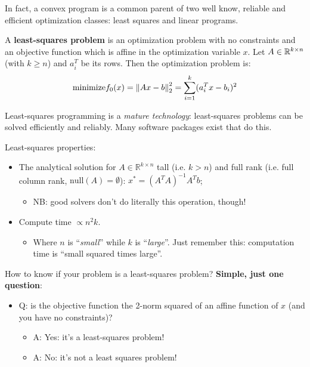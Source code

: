 In fact, a convex program is a common parent of two well know, reliable and efficient optimization classes: least squares and linear programs.


\begin{Definition}
  A \textbf{least-squares problem} is an optimization problem with no constraints and an objective function which is affine in the optimization variable $x$. Let $A\in\mathbb R^{k\times n}$ (with $k\ge n$) and $a_i^T$ be its rows. Then the optimization problem is:
  \begin{equation*}
    \text{minimize} f_0(x) = \left\|Ax-b\right\|_{2}^2 = \sum_{i=1}^k (a_i^Tx-b_i)^2
  \end{equation*}
\end{Definition}

Least-squares programming is a \textit{mature technology}: least-squares problems can be solved efficiently and reliably. Many software packages exist that do this.

\begin{Fact}
  Least-squares properties:
  \begin{itemize}
  \item The analytical solution for $A\in\mathbb R^{k\times n}$ tall (i.e. $k>n$) and full rank (i.e. full column rank, $\text{null}(A)=\emptyset$): $x^*=(A^TA)^{-1}A^Tb$;
    \begin{itemize}
    \item NB: good solvers don't do literally this operation, though!
    \end{itemize}
  \item Compute time $\propto n^2k$.
    \begin{itemize}
    \item Where $n$ is ``\textit{small}'' while $k$ is ``\textit{large}''. Just remember this: computation time is ``small squared times large''.
    \end{itemize}
  \end{itemize}
\end{Fact}

How to know if your problem is a least-squares problem? \textbf{Simple, just one question}:

\begin{itemize}
\item Q: is the objective function the 2-norm squared of an affine function of $x$ (and you have no constraints)?
  \begin{itemize}
  \item A: Yes: it's a least-squares problem!
  \item A: No: it's not a least squares problem!
  \end{itemize}
\end{itemize}

